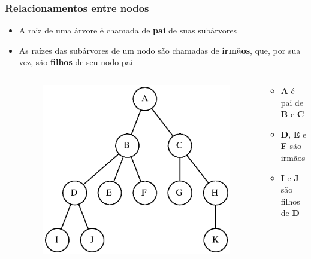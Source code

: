 \documentclass[aspectratio=169]{beamer}
\begin{document}
\begin{frame}\frametitle{Relacionamentos entre nodos}
\begin{itemize}
	\item A raiz de uma árvore é chamada de \textbf{pai} de suas subárvores
	\item As raízes das subárvores de um nodo são chamadas de \textbf{irmãos}, que, por sua vez, são \textbf{filhos} de seu nodo pai
\begin{columns}[T]
\begin{column}{0.5\linewidth}
\begin{figure}[h]
	\centering
	\includegraphics[height=0.55\paperheight]{imagens/arvore3.eps}
\end{figure}
\end{column}
\begin{column}{0.5\linewidth}
\begin{itemize}
	\item \textbf{A} é pai de \textbf{B} e \textbf{C}
	\item \textbf{D}, \textbf{E} e \textbf{F} são irmãos
	\item \textbf{I} e \textbf{J} são filhos de \textbf{D}
\end{itemize}
\end{column}
\end{columns}
\end{itemize}
\end{frame}
\end{document}

